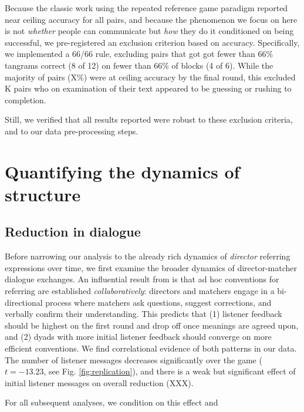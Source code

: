 \documentclass[alpha-refs]{wiley-article}
\begin{document}
Because the classic work using the repeated reference game paradigm reported near ceiling accuracy for all pairs, and because the phenomenon we focus on here is not \emph{whether} people can communicate but \emph{how} they do it conditioned on being successful, we pre-registered an exclusion criterion based on accuracy. 
Specifically, we implemented a 66/66 rule, excluding pairs that got got fewer than 66\% tangrams correct (8 of 12) on fewer than 66\% of blocks (4 of 6). 
While the majority of pairs (X\%) were at ceiling accuracy by the final round, this excluded K pairs who on examination of their text appeared to be guessing or rushing to completion.

Still, we verified that all results reported were robust to these exclusion criteria, and to our data pre-processing steps.

\section{Quantifying the dynamics of structure}\label{results}

\subsection{Reduction in dialogue}\label{listener-feedback}

Before narrowing our analysis to the already rich dynamics of \emph{director} referring expressions over time, we first examine the broader dynamics of director-matcher dialogue exchanges. 
An influential result from \cite[see also \citealp{KraussWeinheimer66_Tangrams, GarrodFayLeeOberlanderMacLeod07_GraphicalSymbolSystems}]{clarkReferringCollaborativeProcess1986} is that ad hoc conventions for referring are established \emph{collaboratively}: directors and matchers engage in a bi-directional process where matchers ask questions, suggest corrections, and verbally confirm their understanding. This predicts that (1) listener feedback should be highest on the first round and drop off once meanings are agreed upon, and (2) dyads with more initial listener feedback should converge on more efficient conventions. 
We find correlational evidence of both patterns in our data. 
The number of listener messages decreases significantly over the game (\(t = -13.23\), see Fig. \ref{fig:replication}), and there is a weak but significant effect of initial listener messages on overall reduction (XXX).

For all subsequent analyses, we condition on this effect and 
\end{document}
